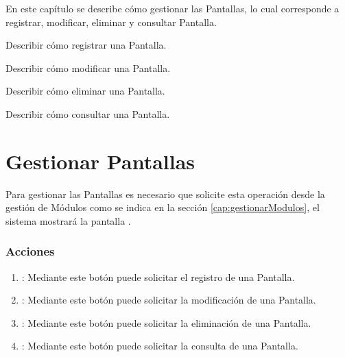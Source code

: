 
En este capítulo se describe cómo gestionar las Pantallas, lo cual corresponde a registrar, modificar, eliminar y
consultar Pantalla.\\


\begin{objetivos}
	\item Describir cómo registrar una Pantalla.
	\item Describir cómo modificar una Pantalla.
	\item Describir cómo eliminar una Pantalla.
	\item Describir cómo consultar una Pantalla.
\end{objetivos}

\section{Gestionar Pantallas}

Para gestionar las Pantallas es necesario que solicite esta operación desde la gestión de Módulos como se indica en la sección \ref{cap:gestionarModulos}, el sistema mostrará la pantalla .


\subsubsection{Acciones}

\begin{enumerate}
	\item {}: Mediante este botón puede solicitar el registro de una Pantalla.
	\item {}: Mediante este botón puede solicitar la modificación de una Pantalla.
	\item {}: Mediante este botón puede solicitar la eliminación de una Pantalla.
	\item {}: Mediante este botón puede solicitar la consulta de una Pantalla.
\end{enumerate}






